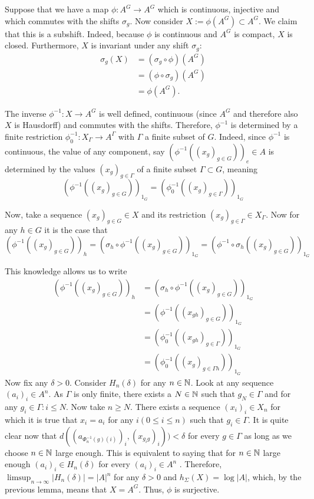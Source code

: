 Suppose that we have a map $\phi: A^G \to A^G$ which is continuous, injective and which commutes with the shifts $\sigma_g$. Now consider $X := \phi(A^G) \subset A^G$. We claim that this is a subshift. Indeed, because $\phi$ is continuous and $A^G$ is compact, $X$ is closed. Furthermore, $X$ is invariant under any shift $\sigma_g$: 
		\begin{align*}
		\sigma_g(X)
		&= (\sigma_g \circ \phi) (A^G) \\
		&= (\phi \circ \sigma_g)(A^G) \\
		&= \phi(A^G).
		\end{align*}
		
The inverse $\phi^{-1}: X \to A^G$ is well defined, continuous (since $A^G$ and therefore also $X$ is Hausdorff) and commutes with the shifts. Therefore,  $\phi^{-1}$ is determined by a finite restriction $\phi^{-1}_0: X_{\Gamma} \to A^{\Gamma}$ with $\Gamma$ a finite subset of $G$. Indeed, since $\phi^{-1}$ is continuous, the value of any component, say $(\phi^{-1}((x_g)_{g \in G}))_e \in A$ is determined by the values $(x_g)_{g \in \Gamma}$ of a finite subset $\Gamma \subset G$, meaning 
		\[
		(\phi^{-1}((x_g)_{g \in G}))_{1_G} = (\phi^{-1}_0((x_g)_{g \in \Gamma}))_{1_G}
		\]

Now, take a sequence $(x_g)_{g \in G} \in X$ and its restriction $(x_g)_{g \in \Gamma} \in X_{\Gamma}$. Now for any $h \in G$ it is the case that 
		\[
		(\phi^{-1}((x_g)_{g \in G}))_h = (\sigma_h \circ \phi^{-1}((x_g)_{g \in G}))_{1_G}  = (\phi^{-1} \circ \sigma_h((x_g)_{g \in G}))_{1_G}
		\]

This knowledge allows us to write
		\begin{align*}
		(\phi^{-1}((x_g)_{g \in G}))_h
		&= (\sigma_h \circ \phi^{-1}((x_g)_{g \in G}))_{1_G} \\
		&= (\phi^{-1}((x_{gh})_{g \in G}))_{1_G} \\
		&= (\phi^{-1}_0((x_{gh})_{g \in \Gamma}))_{1_G} \\
		&= (\phi^{-1}_0((x_g)_{g \in \Gamma h}))_{1_G}
		\end{align*}
Now fix any $\delta > 0$. Consider $H_n(\delta)$ for any $n \in \mathbb{N}$. Look at any sequence $(a_i)_i \in A^n$. As $\Gamma$ is only finite, there exists a $N \in \mathbb{N}$ such that $g_N \in \Gamma$ and for any $g_i \in \Gamma: i \leq N$. Now take $n \geq N$. There exists a sequence $(x_i)_i \in X_n$ for which it is true that $x_i = a_i$ for any $i(0 \leq i \leq n)$ such that $g_i \in \Gamma$. It is quite clear now that $d((a_{\Phi^{-1}_n(g)(i)})_i,(x_{g_i g})_i)) < \delta$ for every $g \in \Gamma$ as long as we choose $n \in \mathbb{N}$ large enough. This is equivalent to saying that for $n \in \mathbb{N}$ large enough $(a_i)_i \in H_n(\delta)$ for every $(a_i)_i \in A^n$ . Therefore, $\limsup_{n \to \infty} |H_n(\delta)| = |A|^{n}$ for any $\delta >0$ and $h_\Sigma(X) = \log |A|$, which, by the previous lemma, means that $X = A^G$. Thus, $\phi$ is surjective.


